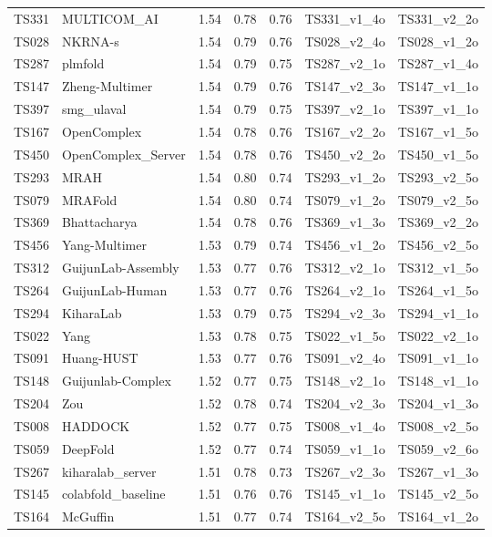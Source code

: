 \begin{table}[ht]
{\begin{tabular}{llrrrll}
TS331 & MULTICOM\_AI & 1.54 & 0.78 & 0.76 & TS331\_v1\_4o & TS331\_v2\_2o \\ 
TS028 & NKRNA-s & 1.54 & 0.79 & 0.76 & TS028\_v2\_4o & TS028\_v1\_2o \\ 
TS287 & plmfold & 1.54 & 0.79 & 0.75 & TS287\_v2\_1o & TS287\_v1\_4o \\ 
TS147 & Zheng-Multimer & 1.54 & 0.79 & 0.76 & TS147\_v2\_3o & TS147\_v1\_1o \\ 
TS397 & smg\_ulaval & 1.54 & 0.79 & 0.75 & TS397\_v2\_1o & TS397\_v1\_1o \\ 
TS167 & OpenComplex & 1.54 & 0.78 & 0.76 & TS167\_v2\_2o & TS167\_v1\_5o \\ 
TS450 & OpenComplex\_Server & 1.54 & 0.78 & 0.76 & TS450\_v2\_2o & TS450\_v1\_5o \\ 
TS293 & MRAH & 1.54 & 0.80 & 0.74 & TS293\_v1\_2o & TS293\_v2\_5o \\ 
TS079 & MRAFold & 1.54 & 0.80 & 0.74 & TS079\_v1\_2o & TS079\_v2\_5o \\ 
TS369 & Bhattacharya & 1.54 & 0.78 & 0.76 & TS369\_v1\_3o & TS369\_v2\_2o \\ 
TS456 & Yang-Multimer & 1.53 & 0.79 & 0.74 & TS456\_v1\_2o & TS456\_v2\_5o \\ 
TS312 & GuijunLab-Assembly & 1.53 & 0.77 & 0.76 & TS312\_v2\_1o & TS312\_v1\_5o \\ 
TS264 & GuijunLab-Human & 1.53 & 0.77 & 0.76 & TS264\_v2\_1o & TS264\_v1\_5o \\ 
TS294 & KiharaLab & 1.53 & 0.79 & 0.75 & TS294\_v2\_3o & TS294\_v1\_1o \\ 
TS022 & Yang & 1.53 & 0.78 & 0.75 & TS022\_v1\_5o & TS022\_v2\_1o \\ 
TS091 & Huang-HUST & 1.53 & 0.77 & 0.76 & TS091\_v2\_4o & TS091\_v1\_1o \\ 
TS148 & Guijunlab-Complex & 1.52 & 0.77 & 0.75 & TS148\_v2\_1o & TS148\_v1\_1o \\ 
TS204 & Zou & 1.52 & 0.78 & 0.74 & TS204\_v2\_3o & TS204\_v1\_3o \\ 
TS008 & HADDOCK & 1.52 & 0.77 & 0.75 & TS008\_v1\_4o & TS008\_v2\_5o \\ 
TS059 & DeepFold & 1.52 & 0.77 & 0.74 & TS059\_v1\_1o & TS059\_v2\_6o \\ 
TS267 & kiharalab\_server & 1.51 & 0.78 & 0.73 & TS267\_v2\_3o & TS267\_v1\_3o \\ 
TS145 & colabfold\_baseline & 1.51 & 0.76 & 0.76 & TS145\_v1\_1o & TS145\_v2\_5o \\ 
TS164 & McGuffin & 1.51 & 0.77 & 0.74 & TS164\_v2\_5o & TS164\_v1\_2o \\ 

\end{tabular}}
\end{table}
